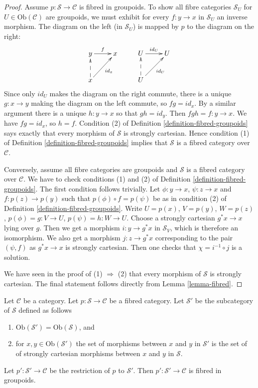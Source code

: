 \begin{proof}
Assume $p : \mathcal{S} \to \mathcal{C}$ is fibred in groupoids.
To show all fibre categories $\mathcal{S}_U$ for
$U \in \text{Ob}(\mathcal{C})$
are groupoids, we must exhibit for every $f : y \to x$ in $\mathcal{S}_U$ an
inverse morphism.  The diagram on the left (in $\mathcal{S}_U$) is mapped by
$p$ to the diagram on the right:
$$
\xymatrix{
y \ar[r]^f & x & U \ar[r]^{id_U} & U \\
x \ar@{-->}[u] \ar[ru]_{id_x} & & U \ar@{-->}[u]\ar[ru]_{id_U} & \\
}
$$
Since only $id_U$ makes the diagram on the right commute, there is a unique
$g : x \to y$ making the diagram on the left commute, so $fg = id_x$.  By a
similar argument there is a unique $h : y \to x$ so that $gh = id_y$.  Then
$fgh = f : y \to x$.  We have $fg = id_x$, so $h = f$.
Condition (2) of Definition \ref{definition-fibred-groupoids} says exactly
that every morphism of $\mathcal{S}$ is strongly cartesian. Hence condition
(1) of Definition \ref{definition-fibred-groupoids} implies that
$\mathcal{S}$ is a fibred category over $\mathcal{C}$.

\medskip\noindent
Conversely, assume all fibre categories are groupoids and
$\mathcal{S}$ is a fibred category over $\mathcal{C}$.
We have to check conditions (1) and (2) of
Definition \ref{definition-fibred-groupoids}.
The first condition follows trivially. Let $\phi : y \to x$,
$\psi : z \to x$ and $f : p(z) \to p(y)$ such that
$p(\phi) \circ f = p(\psi)$ be as in condition (2) of
Definition \ref{definition-fibred-groupoids}.
Write $U = p(x)$, $V = p(y)$, $W = p(z)$, $p(\phi) = g : V \to U$,
$p(\psi) = h : W \to U$. Choose a strongly cartesian $g^*x \to x$
lying over $g$. Then we get a morphism $i : y \to g^*x$ in
$\mathcal{S}_V$, which is therefore an isomorphism. We
also get a morphism $j : z \to g^*x$ corresponding to
the pair $(\psi, f)$ as $g^*x \to x$ is strongly cartesian.
Then one checks that $\chi = i^{-1} \circ j$ is a solution.

\medskip\noindent
We have seen in the proof of (1) $\Rightarrow$ (2) that
every morphism of $\mathcal{S}$ is strongly cartesian.
The final statement follows directly from Lemma \ref{lemma-fibred}.
\end{proof}

\begin{lemma}
\label{lemma-fibred-gives-fibred-groupoids}
Let $\mathcal{C}$ be a category.
Let $p : \mathcal{S} \to \mathcal{C}$ be a fibred category.
Let $\mathcal{S}'$ be the subcategory of $\mathcal{S}$ defined
as follows
\begin{enumerate}
\item $\text{Ob}(\mathcal{S}') = \text{Ob}(\mathcal{S})$, and
\item for $x, y \in \text{Ob}(\mathcal{S}')$ the set of morphisms between $x$
and $y$ in $\mathcal{S}'$ is the set of of strongly cartesian morphisms between
$x$ and $y$ in $\mathcal{S}$.
\end{enumerate}
Let $p' : \mathcal{S}' \to \mathcal{C}$ be the restriction of $p$
to $\mathcal{S}'$. Then $p' : \mathcal{S}' \to \mathcal{C}$ is fibred
in groupoids.
\end{lemma}

